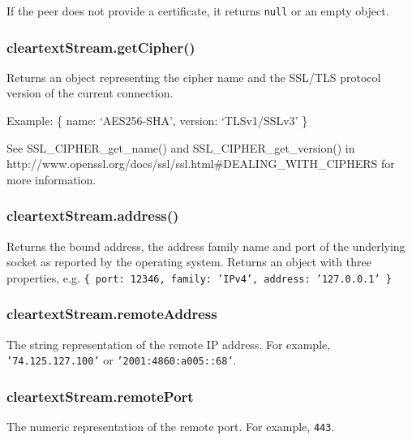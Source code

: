 \begin{Shaded}
\begin{Highlighting}[]
\NormalTok{\{ }\NormalTok{: }
   \NormalTok{\{ }\NormalTok{: }\NormalTok{,}
     \NormalTok{: }\NormalTok{,}
     \NormalTok{: }\NormalTok{,}
     \NormalTok{: }\NormalTok{,}
     \NormalTok{: }\NormalTok{,}
     \NormalTok{: } \NormalTok{\},}
  \NormalTok{: }
   \NormalTok{\{ }\NormalTok{: }\NormalTok{,}
     \NormalTok{: }\NormalTok{,}
     \NormalTok{: }\NormalTok{,}
     \NormalTok{: }\NormalTok{,}
     \NormalTok{: }\NormalTok{,}
     \NormalTok{: } \NormalTok{\},}
  \NormalTok{: }\NormalTok{,}
  \NormalTok{: }\NormalTok{,}
  \NormalTok{: } \NormalTok{\}}
\end{Highlighting}
\end{Shaded}

If the peer does not provide a certificate, it returns \texttt{null} or
an empty object.

\subsubsection{cleartextStream.getCipher()}

Returns an object representing the cipher name and the SSL/TLS protocol
version of the current connection.

Example: \{ name: `AES256-SHA', version: `TLSv1/SSLv3' \}

See SSL\_CIPHER\_get\_name() and SSL\_CIPHER\_get\_version() in
http://www.openssl.org/docs/ssl/ssl.html\#DEALING\_WITH\_CIPHERS for
more information.

\subsubsection{cleartextStream.address()}

Returns the bound address, the address family name and port of the
underlying socket as reported by the operating system. Returns an object
with three properties, e.g.
\texttt{\{ port: 12346, family: 'IPv4', address: '127.0.0.1' \}}

\subsubsection{cleartextStream.remoteAddress}

The string representation of the remote IP address. For example,
\texttt{'74.125.127.100'} or \texttt{'2001:4860:a005::68'}.

\subsubsection{cleartextStream.remotePort}

The numeric representation of the remote port. For example,
\texttt{443}.
